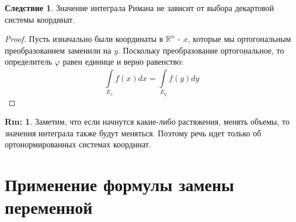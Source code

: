 \documentclass[12pt]{article}
\newcommand{\MR}{\mathbb{R}}
\theoremstyle{definition}
\newtheorem{rem}{Rm:}
\newtheorem{corollary}{Следствие}
\newcommand{\ddint}[2]{\displaystyle\int\limits_{#1}^{#2}}
\begin{document}
\begin{corollary}
	Значение интеграла Римана не зависит от выбора декартовой системы координат.
\end{corollary}
\begin{proof}
	Пусть изначально были координаты в $\MR^n$ - $x$, которые мы ортогональным преобразованием заменили на $y$. Поскольку преобразование ортогональное, то определитель $\varphi$ равен единице и верно равенство:
	$$
		\ddint{E_x}{}f(x)dx = \ddint{E_y}{}f(y)dy
	$$
\end{proof}
\begin{rem}
	Заметим, что если начнутся какие-либо растяжения, менять объемы, то значения интеграла также будут меняться. Поэтому речь идет только об ортонормированных системах координат.
\end{rem}
\newpage
\section*{Применение формулы замены переменной}
\end{document}
